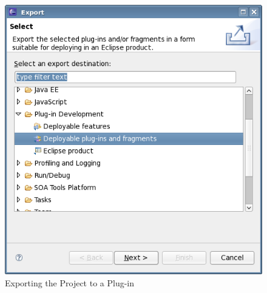 \begin{enumerate}
\begin{figure}[h]
\begin{center}
\includegraphics[width=12.5cm]{Tasks/GEF/PS/exportplugin}
\caption{Exporting the Project to a Plug-in}
\label{exportplugin}
\end{center}
\end{figure}

\end{enumerate}
